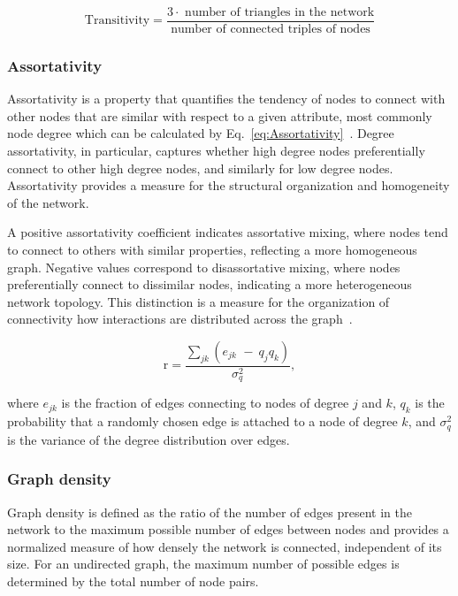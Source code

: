 \documentclass[pdflatex,sn-mathphys-num]{sn-jnl}%
\theoremstyle{thmstyleone}%
\theoremstyle{thmstyletwo}%
\theoremstyle{thmstylethree}%
\begin{document}
\begin{equation}
\mathrm{Transitivity} = \frac{3\cdot \text{ number of triangles in the network}}{\text{number of connected triples of nodes}} 
\label{eq:Transitivity}
\end{equation}
  
\subsubsection*{Assortativity}\label{subsubsec:assortativity}

Assortativity is a property that quantifies the tendency of nodes to connect with other nodes that are similar with respect to a given attribute, most commonly node degree which can be calculated by Eq.~\ref{eq:Assortativity}~\cite{Newman2002Assortativity}.
Degree assortativity, in particular, captures whether high degree nodes preferentially connect to other high degree nodes, and similarly for low degree nodes.
Assortativity provides a measure for the structural organization and homogeneity of the network.

A positive assortativity coefficient indicates assortative mixing, where nodes tend to connect to others with similar properties, reflecting a more homogeneous graph.
Negative values correspond to disassortative mixing, where nodes preferentially connect to dissimilar nodes, indicating a more heterogeneous network topology.
This distinction is a measure for the organization of connectivity how interactions are distributed across the graph~\cite{Newman2002Assortativity}.

\begin{equation}
\mathrm{r}=\frac{\sum_{jk}{(e_{jk\ \ }-\ q_jq_k)}}{\sigma_q^2},
\label{eq:Assortativity}
\end{equation}

 where $e_{jk}$ is the fraction of edges connecting to nodes of degree $j$ and $k$, $q_k$ is the probability that a randomly chosen edge is attached to a node of degree $k$, and $\sigma_q^2$ is the variance of the degree distribution over edges.
 
\subsubsection*{Graph density}\label{subsubsec:graph_density}

Graph density is defined as the ratio of the number of edges present in the network to the maximum possible number of edges between nodes and provides a normalized measure of how densely the network is connected, independent of its size.
For an undirected graph, the maximum number of possible edges is determined by the total number of node pairs.
\end{document}
